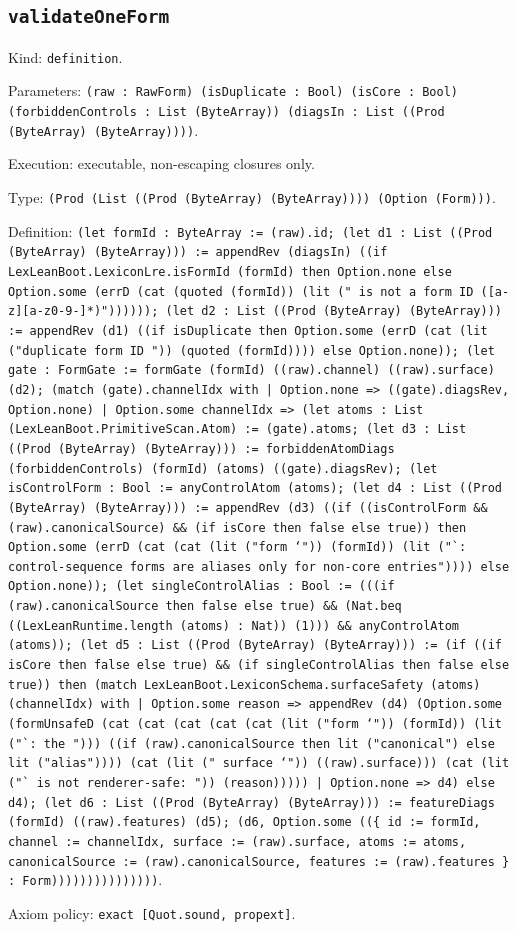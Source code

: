 \documentclass[11pt]{article}
\begin{document}
\subsection*{\texttt{validateOneForm}}
\noindent Kind: \texttt{definition}.\par
\noindent Parameters: \texttt{(raw : RawForm) (isDuplicate : Bool) (isCore : Bool) (forbiddenControls : List (ByteArray)) (diagsIn : List ((Prod (ByteArray) (ByteArray))))}.\par
\noindent Execution: executable, non-escaping closures only.\par
\noindent Type: \texttt{(Prod (List ((Prod (ByteArray) (ByteArray)))) (Option (Form)))}.\par
\noindent Definition: \texttt{(let formId : ByteArray := (raw).id; (let d1 : List ((Prod (ByteArray) (ByteArray))) := appendRev (diagsIn) ((if LexLeanBoot.LexiconLre.isFormId (formId) then Option.none else Option.some (errD (cat (quoted (formId)) (lit (" is not a form ID ([a-z][a-z0-9-]*)")))))); (let d2 : List ((Prod (ByteArray) (ByteArray))) := appendRev (d1) ((if isDuplicate then Option.some (errD (cat (lit ("duplicate form ID ")) (quoted (formId)))) else Option.none)); (let gate : FormGate := formGate (formId) ((raw).channel) ((raw).surface) (d2); (match (gate).channelIdx with | Option.none => ((gate).diagsRev, Option.none) | Option.some channelIdx => (let atoms : List (LexLeanBoot.PrimitiveScan.Atom) := (gate).atoms; (let d3 : List ((Prod (ByteArray) (ByteArray))) := forbiddenAtomDiags (forbiddenControls) (formId) (atoms) ((gate).diagsRev); (let isControlForm : Bool := anyControlAtom (atoms); (let d4 : List ((Prod (ByteArray) (ByteArray))) := appendRev (d3) ((if ((isControlForm \&\& (raw).canonicalSource) \&\& (if isCore then false else true)) then Option.some (errD (cat (cat (lit ("form `")) (formId)) (lit ("`: control-sequence forms are aliases only for non-core entries")))) else Option.none)); (let singleControlAlias : Bool := (((if (raw).canonicalSource then false else true) \&\& (Nat.beq ((LexLeanRuntime.length (atoms) : Nat)) (1))) \&\& anyControlAtom (atoms)); (let d5 : List ((Prod (ByteArray) (ByteArray))) := (if ((if isCore then false else true) \&\& (if singleControlAlias then false else true)) then (match LexLeanBoot.LexiconSchema.surfaceSafety (atoms) (channelIdx) with | Option.some reason => appendRev (d4) (Option.some (formUnsafeD (cat (cat (cat (cat (cat (lit ("form `")) (formId)) (lit ("`: the "))) ((if (raw).canonicalSource then lit ("canonical") else lit ("alias")))) (cat (lit (" surface `")) ((raw).surface))) (cat (lit ("` is not renderer-safe: ")) (reason))))) | Option.none => d4) else d4); (let d6 : List ((Prod (ByteArray) (ByteArray))) := featureDiags (formId) ((raw).features) (d5); (d6, Option.some ((\{ id := formId, channel := channelIdx, surface := (raw).surface, atoms := atoms, canonicalSource := (raw).canonicalSource, features := (raw).features \} : Form)))))))))))))))}.\par
\noindent Axiom policy: \texttt{exact [Quot.sound, propext]}.\par
\end{document}
